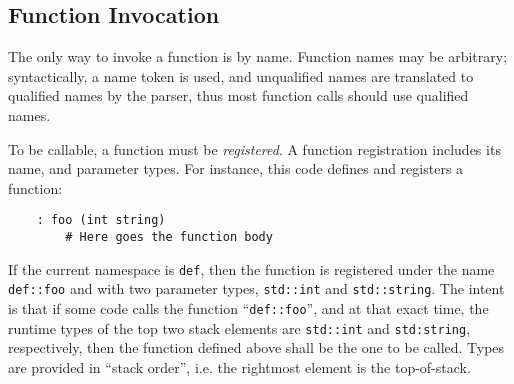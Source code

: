 \subsection{Function Invocation}

The only way to invoke a function is by name. Function names may be
arbitrary; syntactically, a name token is used, and unqualified names
are translated to qualified names by the parser, thus most function
calls should use qualified names.

To be callable, a function must be \emph{registered}. A function
registration includes its name, and parameter types. For instance,
this code defines and registers a function:
\begin{verbatim}
    : foo (int string)
        # Here goes the function body
\end{verbatim}
If the current namespace is \verb|def|, then the function is registered
under the name \verb|def::foo| and with two parameter types,
\verb|std::int| and \verb|std::string|. The intent is that if some code
calls the function ``\verb|def::foo|'', and at that exact time, the
runtime types of the top two stack elements are \verb|std::int| and
\verb|std:string|, respectively, then the function defined above shall
be the one to be called. Types are provided in ``stack order'', i.e.
the rightmost element is the top-of-stack.

